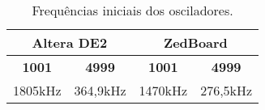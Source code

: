 \begin{table}[htp]
\centering
\caption{Frequências iniciais dos osciladores.}
\begin{tabular}{|cc|cc|}
\hline
\multicolumn{2}{|c|}{\textbf{Altera DE2}} & \multicolumn{2}{c|}{\textbf{ZedBoard}} \\ \hline
\multicolumn{1}{|c|}{\textbf{1001}} & \textbf{4999} & \multicolumn{1}{c|}{\textbf{1001}} & \textbf{4999} \\ \hline
\multicolumn{1}{|c|}{1805kHz} & 364,9kHz & \multicolumn{1}{c|}{1470kHz} & 276,5kHz \\ \hline
\end{tabular}
\label{tab:FreqIniciais}
\end{table}